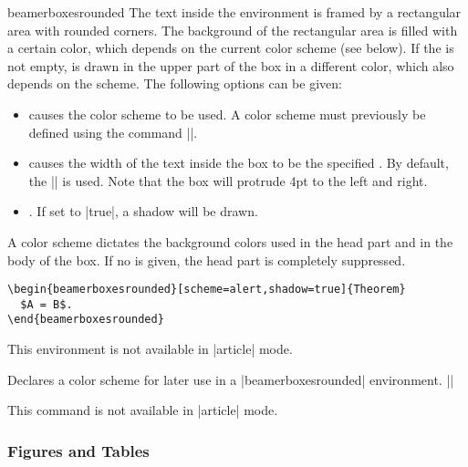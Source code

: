 \begin{environment}{{beamerboxesrounded}}
  The text inside the environment is framed by a rectangular area with
  rounded corners. The background of the rectangular area is filled
  with a certain color, which depends on the current color scheme (see
  below). If the  is not empty,  is drawn in the
  upper part of the box in a different color, which also depends on
  the scheme. The following options can be given:
  \begin{itemize}
  \item {} causes the color scheme  to be
    used. A color scheme must previously be defined using the command
    |\beamerboxesdeclarecolorscheme|.
  \item {} causes the width of the text inside
    the box to be the specified . By default, the
    |\textwidth| is used. Note that the box will protrude 4pt to the
    left and right.
  \item {}. If set to |true|, a shadow will
    be drawn.    
  \end{itemize}
  A color scheme dictates the background colors used in the head part
  and in the body of the box. If no  is given, the head
  part is completely suppressed.
  \example
\begin{verbatim}
\begin{beamerboxesrounded}[scheme=alert,shadow=true]{Theorem}
  $A = B$.
\end{beamerboxesrounded}
\end{verbatim}

  \articlenote
  This environment is not available in |article| mode.
\end{environment}

\begin{command}{\beamerboxesdeclarecolorscheme{}}
  Declares a color scheme for later use in a |beamerboxesrounded|
  environment.
  \example ||

  \articlenote
  This command is not available in |article| mode.
\end{command}



\subsubsection{Figures and Tables}

